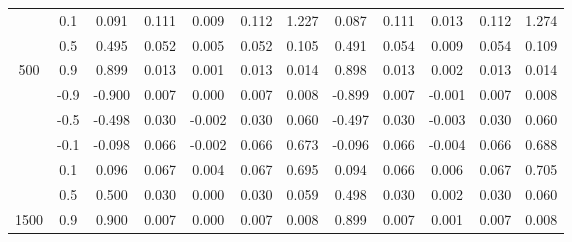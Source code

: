 \begin{table}[h]
{\begin{tabular}{|c|cccccc|ccccc|}
     & \multicolumn{1}{c|}{0.1} & \multicolumn{1}{c|}{0.091} & \multicolumn{1}{c|}{0.111} & \multicolumn{1}{c|}{0.009} & \multicolumn{1}{c|}{0.112} & 1.227 & \multicolumn{1}{c|}{0.087} & \multicolumn{1}{c|}{0.111} & \multicolumn{1}{c|}{0.013} & \multicolumn{1}{c|}{0.112} & 1.274 \\ \cline{2-12} 
     & \multicolumn{1}{c|}{0.5} & \multicolumn{1}{c|}{0.495} & \multicolumn{1}{c|}{0.052} & \multicolumn{1}{c|}{0.005} & \multicolumn{1}{c|}{0.052} & 0.105 & \multicolumn{1}{c|}{0.491} & \multicolumn{1}{c|}{0.054} & \multicolumn{1}{c|}{0.009} & \multicolumn{1}{c|}{0.054} & 0.109 \\ \cline{2-12} 
    \multirow{-6}{*}{500} & \multicolumn{1}{c|}{0.9} & \multicolumn{1}{c|}{0.899} & \multicolumn{1}{c|}{0.013} & \multicolumn{1}{c|}{0.001} & \multicolumn{1}{c|}{0.013} & 0.014 & \multicolumn{1}{c|}{0.898} & \multicolumn{1}{c|}{0.013} & \multicolumn{1}{c|}{0.002} & \multicolumn{1}{c|}{0.013} & 0.014 \\ \hline
     & \multicolumn{1}{c|}{-0.9} & \multicolumn{1}{c|}{-0.900} & \multicolumn{1}{c|}{0.007} & \multicolumn{1}{c|}{0.000} & \multicolumn{1}{c|}{0.007} & 0.008 & \multicolumn{1}{c|}{-0.899} & \multicolumn{1}{c|}{0.007} & \multicolumn{1}{c|}{-0.001} & \multicolumn{1}{c|}{0.007} & 0.008 \\ \cline{2-12} 
     & \multicolumn{1}{c|}{-0.5} & \multicolumn{1}{c|}{-0.498} & \multicolumn{1}{c|}{0.030} & \multicolumn{1}{c|}{-0.002} & \multicolumn{1}{c|}{0.030} & 0.060 & \multicolumn{1}{c|}{-0.497} & \multicolumn{1}{c|}{0.030} & \multicolumn{1}{c|}{-0.003} & \multicolumn{1}{c|}{0.030} & 0.060 \\ \cline{2-12} 
     & \multicolumn{1}{c|}{-0.1} & \multicolumn{1}{c|}{-0.098} & \multicolumn{1}{c|}{0.066} & \multicolumn{1}{c|}{-0.002} & \multicolumn{1}{c|}{0.066} & 0.673 & \multicolumn{1}{c|}{-0.096} & \multicolumn{1}{c|}{0.066} & \multicolumn{1}{c|}{-0.004} & \multicolumn{1}{c|}{0.066} & 0.688 \\ \cline{2-12} 
     & \multicolumn{1}{c|}{0.1} & \multicolumn{1}{c|}{0.096} & \multicolumn{1}{c|}{0.067} & \multicolumn{1}{c|}{0.004} & \multicolumn{1}{c|}{0.067} & 0.695 & \multicolumn{1}{c|}{0.094} & \multicolumn{1}{c|}{0.066} & \multicolumn{1}{c|}{0.006} & \multicolumn{1}{c|}{0.067} & 0.705 \\ \cline{2-12} 
     & \multicolumn{1}{c|}{0.5} & \multicolumn{1}{c|}{0.500} & \multicolumn{1}{c|}{0.030} & \multicolumn{1}{c|}{0.000} & \multicolumn{1}{c|}{0.030} & 0.059 & \multicolumn{1}{c|}{0.498} & \multicolumn{1}{c|}{0.030} & \multicolumn{1}{c|}{0.002} & \multicolumn{1}{c|}{0.030} & 0.060 \\ \cline{2-12} 
    \multirow{-6}{*}{1500} & \multicolumn{1}{c|}{0.9} & \multicolumn{1}{c|}{0.900} & \multicolumn{1}{c|}{0.007} & \multicolumn{1}{c|}{0.000} & \multicolumn{1}{c|}{0.007} & 0.008 & \multicolumn{1}{c|}{0.899} & \multicolumn{1}{c|}{0.007} & \multicolumn{1}{c|}{0.001} & \multicolumn{1}{c|}{0.007} & 0.008 \\ \hline
    \end{tabular}
    }
    \label{table:performance}
    \end{table}

    